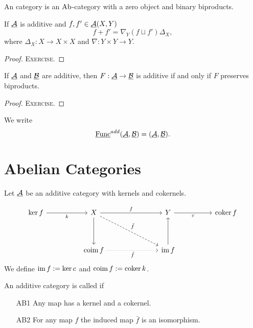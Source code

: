 \begin{definition*}
	An  category is an \( \mathrm{Ab} \)-category with a zero object and binary biproducts.
\end{definition*}

\begin{proposition*}
	If \( \underline{\mathcal{A}} \) is additive and \( f, f' \in \underline{\mathcal{A}}(X, Y) \)
	\[
		f+f' = \nabla_Y (f \sqcup f') \Delta_X,
	\]
	where \( \Delta_X: X \to X \times X \) and \( \nabla: Y \times Y \to Y \).
\end{proposition*}
\begin{proof}
	\textsc{Exercise}.
\end{proof}

\begin{proposition*}
	If \( \underline{\mathcal{A}} \) and \( \underline{\mathcal{B}} \) are additive, then \( F: \underline{\mathcal{A}} \to \underline{\mathcal{B}} \) is additive if and only if \( F \) preserves biproducts.
\end{proposition*}
\begin{proof}
	\textsc{Exercise}.
\end{proof}

We write
\[
	\underline{\mathrm{Func}}^{add}(\underline{\mathcal{A}}, \underline{\mathcal{B}}) = (\underline{\mathcal{A}}, \underline{\mathcal{B}}).
\]

\section{Abelian Categories}

Let \( \underline{\mathcal{A}} \) be an additive category with kernels and cokernels.

\[
	\begin{tikzcd}{\ker f} && X &&& Y && {\coker f} \\
		\\
		&& {\coim f} &&& {\im f}
		\arrow["k"', from=1-1, to=1-3]
		\arrow["f", from=1-3, to=1-6]
		\arrow[from=1-3, to=3-3]
		\arrow["{\tilde{f}}", dashed, from=1-3, to=3-6]
		\arrow["c"', from=1-6, to=1-8]
		\arrow["{\bar{f}}"', dotted, from=3-3, to=3-6]
		\arrow[from=3-6, to=1-6]
	\end{tikzcd}
\]
We define \( \operatorname{im} f := \ker c \) and \( \operatorname{coim} f := \operatorname{coker} k \).

\begin{definition*}
	An additive category is called  if
	\begin{enumerate}
		\item[AB1] Any map has a kernel and a cokernel.
		\item[AB2] For any map \( f \) the induced map \( \bar{f} \) is an isomorphism.
	\end{enumerate}
\end{definition*}

